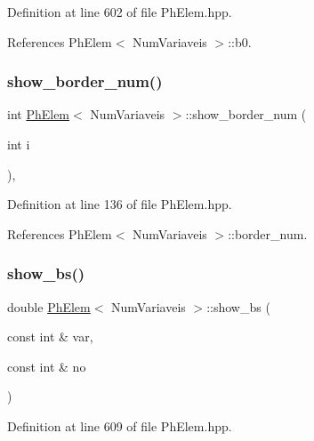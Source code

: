 Definition at line 602 of file Ph\+Elem.\+hpp.



References Ph\+Elem$<$ Num\+Variaveis $>$\+::b0.

\mbox{\label{classPhElem_a13564919b6d9747f0e6b33f3e8aae31b}} 
\subsubsection{\texorpdfstring{show\+\_\+border\+\_\+num()}{show\_border\_num()}}
{\footnotesize\ttfamily int \hyperlink{classPhElem}{Ph\+Elem}$<$ Num\+Variaveis $>$\+::show\+\_\+border\+\_\+num (\begin{DoxyParamCaption}\item[{int}]{i }\end{DoxyParamCaption})\hspace{0.3cm}{\ttfamily [inline]}, {\ttfamily [inherited]}}



Definition at line 136 of file Ph\+Elem.\+hpp.



References Ph\+Elem$<$ Num\+Variaveis $>$\+::border\+\_\+num.

\mbox{\label{classPhElem_a0846ec2cbd31a24aea440c29a71d50ec}} 
\subsubsection{\texorpdfstring{show\+\_\+bs()}{show\_bs()}}
{\footnotesize\ttfamily double \hyperlink{classPhElem}{Ph\+Elem}$<$ Num\+Variaveis $>$\+::show\+\_\+bs (\begin{DoxyParamCaption}\item[{const int \&}]{var,  }\item[{const int \&}]{no }\end{DoxyParamCaption})\hspace{0.3cm}{\ttfamily [inherited]}}



Definition at line 609 of file Ph\+Elem.\+hpp.



